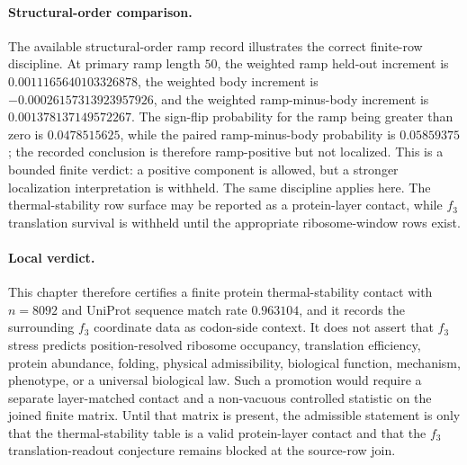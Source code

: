 \paragraph{Structural-order comparison.}
The available structural-order ramp record illustrates the correct finite-row discipline.  At primary ramp length $50$, the weighted ramp held-out increment is $0.0011165640103326878$, the weighted body increment is $-0.00026157313923957926$, and the weighted ramp-minus-body increment is $0.001378137149572267$.  The sign-flip probability for the ramp being greater than zero is $0.0478515625$, while the paired ramp-minus-body probability is $0.05859375$; the recorded conclusion is therefore ramp-positive but not localized.  This is a bounded finite verdict: a positive component is allowed, but a stronger localization interpretation is withheld.  The same discipline applies here.  The thermal-stability row surface may be reported as a protein-layer contact, while $f_3$ translation survival is withheld until the appropriate ribosome-window rows exist.

\paragraph{Local verdict.}
This chapter therefore certifies a finite protein thermal-stability contact with $n=8092$ and UniProt sequence match rate $0.963104$, and it records the surrounding $f_3$ coordinate data as codon-side context.  It does not assert that $f_3$ stress predicts position-resolved ribosome occupancy, translation efficiency, protein abundance, folding, physical admissibility, biological function, mechanism, phenotype, or a universal biological law.  Such a promotion would require a separate layer-matched contact and a non-vacuous controlled statistic on the joined finite matrix.  Until that matrix is present, the admissible statement is only that the thermal-stability table is a valid protein-layer contact and that the $f_3$ translation-readout conjecture remains blocked at the source-row join.